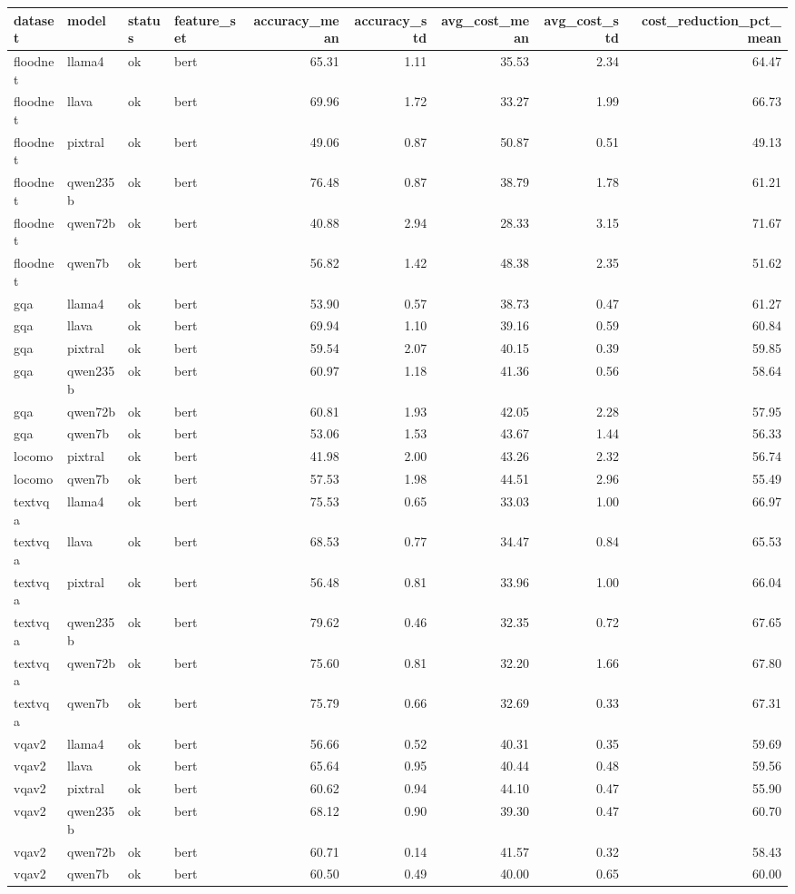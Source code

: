 \begin{tabular}{llllrrrrr}
\toprule
dataset & model & status & feature_set & accuracy_mean & accuracy_std & avg_cost_mean & avg_cost_std & cost_reduction_pct_mean \\
\midrule
floodnet & llama4 & ok & bert & 65.31 & 1.11 & 35.53 & 2.34 & 64.47 \\
floodnet & llava & ok & bert & 69.96 & 1.72 & 33.27 & 1.99 & 66.73 \\
floodnet & pixtral & ok & bert & 49.06 & 0.87 & 50.87 & 0.51 & 49.13 \\
floodnet & qwen235b & ok & bert & 76.48 & 0.87 & 38.79 & 1.78 & 61.21 \\
floodnet & qwen72b & ok & bert & 40.88 & 2.94 & 28.33 & 3.15 & 71.67 \\
floodnet & qwen7b & ok & bert & 56.82 & 1.42 & 48.38 & 2.35 & 51.62 \\
gqa & llama4 & ok & bert & 53.90 & 0.57 & 38.73 & 0.47 & 61.27 \\
gqa & llava & ok & bert & 69.94 & 1.10 & 39.16 & 0.59 & 60.84 \\
gqa & pixtral & ok & bert & 59.54 & 2.07 & 40.15 & 0.39 & 59.85 \\
gqa & qwen235b & ok & bert & 60.97 & 1.18 & 41.36 & 0.56 & 58.64 \\
gqa & qwen72b & ok & bert & 60.81 & 1.93 & 42.05 & 2.28 & 57.95 \\
gqa & qwen7b & ok & bert & 53.06 & 1.53 & 43.67 & 1.44 & 56.33 \\
locomo & pixtral & ok & bert & 41.98 & 2.00 & 43.26 & 2.32 & 56.74 \\
locomo & qwen7b & ok & bert & 57.53 & 1.98 & 44.51 & 2.96 & 55.49 \\
textvqa & llama4 & ok & bert & 75.53 & 0.65 & 33.03 & 1.00 & 66.97 \\
textvqa & llava & ok & bert & 68.53 & 0.77 & 34.47 & 0.84 & 65.53 \\
textvqa & pixtral & ok & bert & 56.48 & 0.81 & 33.96 & 1.00 & 66.04 \\
textvqa & qwen235b & ok & bert & 79.62 & 0.46 & 32.35 & 0.72 & 67.65 \\
textvqa & qwen72b & ok & bert & 75.60 & 0.81 & 32.20 & 1.66 & 67.80 \\
textvqa & qwen7b & ok & bert & 75.79 & 0.66 & 32.69 & 0.33 & 67.31 \\
vqav2 & llama4 & ok & bert & 56.66 & 0.52 & 40.31 & 0.35 & 59.69 \\
vqav2 & llava & ok & bert & 65.64 & 0.95 & 40.44 & 0.48 & 59.56 \\
vqav2 & pixtral & ok & bert & 60.62 & 0.94 & 44.10 & 0.47 & 55.90 \\
vqav2 & qwen235b & ok & bert & 68.12 & 0.90 & 39.30 & 0.47 & 60.70 \\
vqav2 & qwen72b & ok & bert & 60.71 & 0.14 & 41.57 & 0.32 & 58.43 \\
vqav2 & qwen7b & ok & bert & 60.50 & 0.49 & 40.00 & 0.65 & 60.00 \\
\bottomrule
\end{tabular}
